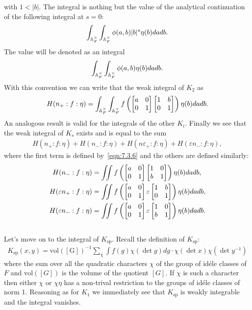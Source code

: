 with $1 < |b|$.
The integral is nothing but the value of the analytical continuation of the following integral at $s=0$:
\begin{align}
    \int_{\mathbb{A}_F^\times} \int_{\mathbb{A}_F^\times} \phi(a, b) |b|^s \eta(b) dadb.
\end{align}
The value will be denoted as an integral
\begin{align}
    \int_{\mathbb{A}_F^\times} \int_{\mathbb{A}_F^\times} \phi(a, b) \eta(b) dadb.
\end{align}
With this convention we can write that the weak integral of $K_2$ as
\begin{align}
    \label{eqn:7.3.6}
    H(n_+: f:\eta) = \int_{\mathbb{A}_F^\times}\int_{\mathbb{A}_F^\times} f\left(\begin{bmatrix} a & 0 \\ 0 & 1 \end{bmatrix} \begin{bmatrix} 1 & b \\ 0 & 1 \end{bmatrix} \right) \eta(b) dadb.
\end{align}
An analogous result is valid for the integrals of the other $K_i$.
Finally we see that the weak integral of $K_s$ exists and is equal to the sum
\begin{align}
    H(n_+:f:\eta) + H(n_-:f:\eta) + H(n\varepsilon_+ :f:\eta) + H(\varepsilon n_-:f:\eta),
\end{align}
where the first term is defined by~\eqref{eqn:7.3.6} and the others are defined similarly:
\begin{align}
    H(n_-:f:\eta) &= \iint f\left(\begin{bmatrix} a & 0 \\ 0 & 1 \end{bmatrix} \begin{bmatrix} 1 & 0 \\ b & 1 \end{bmatrix} \right) \eta(b) da db, \\
    H(\varepsilon n_+:f:\eta) &= \iint f\left(\begin{bmatrix} a & 0 \\ 0 & 1 \end{bmatrix} \varepsilon \begin{bmatrix} 1 & b \\ 0 & 1 \end{bmatrix} \right) \eta(b) da db, \\
    H(\varepsilon n_-:f:\eta) &= \iint f\left(\begin{bmatrix} a & 0 \\ 0 & 1 \end{bmatrix} \varepsilon \begin{bmatrix} 1 & 0 \\ b & 1 \end{bmatrix} \right) \eta(b) da db.
\end{align}

\subsection{}
Let's move on to the integral of $K_{\mathrm{sp}}$.
Recall the definition of $K_{\mathrm{sp}}$:
\begin{align*}
    K_{\mathrm{sp}}(x, y) = \mathrm{vol([G])}^{-1} \sum_{\chi} \int f(g) \chi(\det g) dg \cdot \chi(\det x)\chi(\det y^{-1})
\end{align*}
where the sum over all the quadratic characters $\chi$ of the group of id\'ele classes of $F$ and $\mathrm{vol}([G])$ is the volume of the quotient $[G]$.
If $\chi$ is such a character then either $\chi$ or $\chi\eta$ has a non-trival restriction to the groups of id\'ele classes of norm 1.
Reasoning as for $K_1$ we immediately see that $K_\mathrm{sp}$ is weakly integrable and the integral vanishes.


